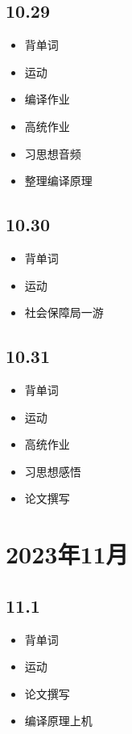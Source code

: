 \documentclass[UTF8]{ctexart}
\begin{document}
\subsection*{10.29}
\begin{itemize}
    \item 背单词
    \item 运动
    \item 编译作业
    \item 高统作业
    \item 习思想音频
    \item 整理编译原理
\end{itemize}

\subsection*{10.30}
\begin{itemize}
    \item 背单词
    \item 运动
    \item 社会保障局一游
\end{itemize}

\subsection*{10.31}
\begin{itemize}
    \item 背单词
    \item 运动
    \item 高统作业
    \item 习思想感悟
    \item 论文撰写
\end{itemize}

\section*{2023年11月}

\subsection*{11.1}
\begin{itemize}
    \item 背单词
    \item 运动
    \item 论文撰写
    \item 编译原理上机
\end{itemize}
\end{document}
